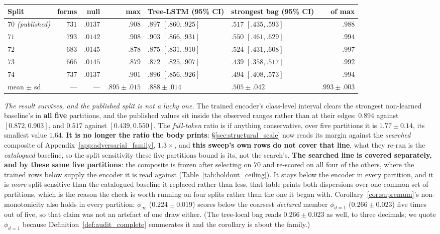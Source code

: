 \begin{center}
\footnotesize
\setlength{\tabcolsep}{3.5pt}
\begin{tabular}{@{}l rrr ll r@{}}
\toprule
Split & forms & null & max & Tree-LSTM (95\% CI) & strongest bag (95\% CI) & of max \\
\midrule
$70$ \emph{(published)} & $731$ & $.0137$ & $.908$ & $.897$ $[.860,.925]$ & $.517$ $[.435,.593]$ & $.988$ \\
$71$ & $793$ & $.0142$ & $.908$ & $.903$ $[.866,.931]$ & $.550$ $[.461,.629]$ & $.994$ \\
$72$ & $683$ & $.0145$ & $.878$ & $.875$ $[.831,.910]$ & $.524$ $[.431,.608]$ & $.997$ \\
$73$ & $666$ & $.0145$ & $.879$ & $.872$ $[.825,.907]$ & $.439$ $[.358,.517]$ & $.992$ \\
$74$ & $737$ & $.0137$ & $.901$ & $.896$ $[.856,.926]$ & $.494$ $[.408,.573]$ & $.994$ \\
\midrule
mean $\pm$ sd & --- & --- & $.895{\pm}.015$ & $\mathbf{.888{\pm}.014}$ & $\mathbf{.505{\pm}.042}$ & $\mathbf{.993{\pm}.003}$ \\
\bottomrule
\end{tabular}
\end{center}

\emph{The result survives, and the published split is not a lucky one.} The trained encoder's class-level interval clears the strongest non-learned baseline's in \textbf{all five} partitions, and the published values sit inside the observed ranges rather than at their edges: $0.894$ against $[0.872,0.903]$, and $0.517$ against $[0.439,0.550]$. The \emph{full-token} ratio is if anything conservative, over five partitions it is $1.77 \pm 0.14$, its smallest value $1.64$. \textbf{It is no longer the ratio the body prints}: \S\ref{sec:structural_scale} now reads its margin against the \emph{searched} composite of Appendix~\ref{app:adversarial_family}, $1.3\times$, and \textbf{this sweep's own rows do not cover that line}, what they re-ran is the \emph{catalogued} baseline, so the split sensitivity these five partitions bound is its, not the search's. \textbf{The searched line is covered separately, and by these same five partitions}: the composite is frozen after selecting on $70$ and re-scored on all four of the others, where the trained rows below supply the encoder it is read against (Table~\ref{tab:holdout_ceiling}). It stays below the encoder in every partition, and it is \emph{more} split-sensitive than the catalogued baseline it replaced rather than less, that table prints both dispersions over one common set of partitions, which is the reason the check is worth running on four splits rather than the one it began with. Corollary~\ref{cor:supremum}'s non-monotonicity also holds in every partition: $\phi_\infty$ ($0.224 \pm 0.019$) scores below the coarsest \emph{declared} member $\phi_{d=1}$ ($0.266 \pm 0.023$) five times out of five, so that claim was not an artefact of one draw either. (The tree-local bag reads $0.266 \pm 0.023$ as well, to three decimals; we quote $\phi_{d=1}$ because Definition~\ref{def:audit_complete} enumerates it and the corollary is about the family.)

